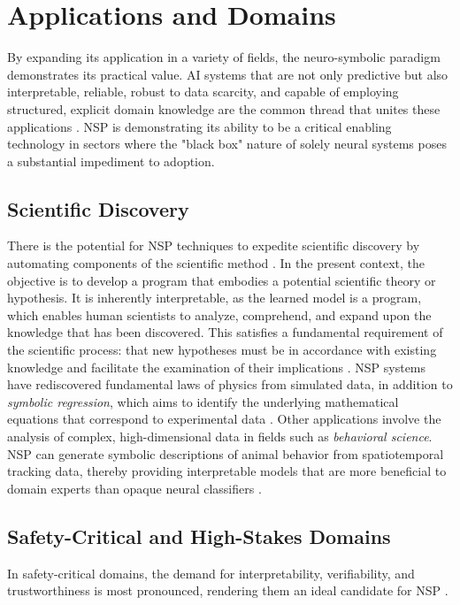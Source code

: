 \documentclass[12pt, a4paper]{report}
\begin{document}
\section{Applications and Domains}
By expanding its application in a variety of fields, the neuro-symbolic paradigm demonstrates its practical value. AI systems that are not only predictive but also interpretable, reliable, robust to data scarcity, and capable of employing structured, explicit domain knowledge are the common thread that unites these applications \citep{bommasani2021opportunities}. NSP is demonstrating its ability to be a critical enabling technology in sectors where the "black box" nature of solely neural systems poses a substantial impediment to adoption.

\subsection{Scientific Discovery}

There is the potential for NSP techniques to expedite scientific discovery by automating components of the scientific method \citep{cranmer2023symbolic}. In the present context, the objective is to develop a program that embodies a potential scientific theory or hypothesis. It is inherently interpretable, as the learned model is a program, which enables human scientists to analyze, comprehend, and expand upon the knowledge that has been discovered. This satisfies a fundamental requirement of the scientific process: that new hypotheses must be in accordance with existing knowledge and facilitate the examination of their implications \citep{cranmer2023symbolic}. NSP systems have rediscovered fundamental laws of physics from simulated data, in addition to \textit{symbolic regression}, which aims to identify the underlying mathematical equations that correspond to experimental data \citep{cranmer2023symbolic}. Other applications involve the analysis of complex, high-dimensional data in fields such as \textit{behavioral science}. NSP can generate symbolic descriptions of animal behavior from spatiotemporal tracking data, thereby providing interpretable models that are more beneficial to domain experts than opaque neural classifiers  \citep{zhan2021framework}.


\subsection{Safety-Critical and High-Stakes Domains}
In safety-critical domains, the demand for interpretability, verifiability, and trustworthiness is most pronounced, rendering them an ideal candidate for NSP \citep{chaudhuri2021neurosymbolic}.
\end{document}
